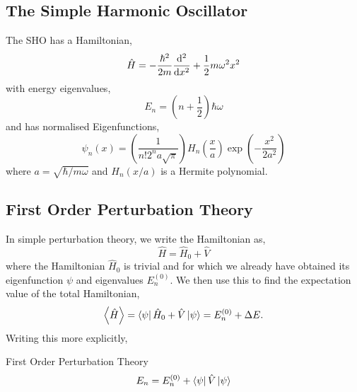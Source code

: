 \documentclass{book}
\begin{document}
\subsection{The Simple Harmonic Oscillator}
The SHO has a Hamiltonian,
\begin{equation}
	\hat{H} = - \frac{\hbar^2}{2m}\dv[2]{x} + \frac{1}{2}m\omega^2x^2
\end{equation}
with energy eigenvalues,
\begin{equation}
	E_n = \left(n + \frac{1}{2}\right)\hbar \omega \label{eq:1D SHO E}
\end{equation}
and has normalised Eigenfunctions,
\begin{equation}
	\psi_n(x) = \left(\frac{1}{n!2^na\sqrt{\pi}}\right)H_n\left(\frac{x}{a}\right)\exp\left(-\frac{x^2}{2a^2}\right)
\end{equation}
where $a = \sqrt{\hbar/m\omega}$ and $H_n(x/a)$ is a Hermite polynomial.
\subsection{First Order Perturbation Theory}
In simple perturbation theory, we write the Hamiltonian as,
\begin{equation}
	\hat{H} = \hat{H}_0 + \hat{V}
\end{equation}
where the Hamiltonian $\hat{H}_0$ is trivial and for which we already have obtained its eigenfunction $\psi$ and eigenvalues $E_n^{(0)}$. We then use this to find the expectation value of the total Hamiltonian,
\begin{equation}
	\left<\hat{H}\right> = \bra{\psi}\hat{H}_0 + \hat{V}\ket{\psi} = E_n^{(0)} + \Delta E.
\end{equation}
Writing this more explicitly,
\begin{Definitions}{First Order Perturbation Theory}{}
	\begin{equation}
		E_n = E_n^{(0)} + \bra{\psi}\hat{V}\ket{\psi}
	\end{equation}
\end{Definitions}
\end{document}
